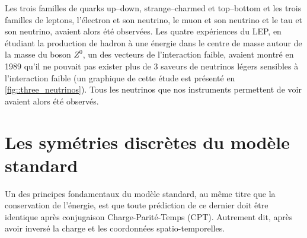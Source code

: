       Les trois familles de quarks up--down, strange--charmed et top--bottom et les trois familles de leptons, l'électron et son neutrino, le muon et son neutrino et le tau et son neutrino, avaient alors été observées. Les quatre expériences du LEP, en étudiant la production de hadron à une énergie dans le centre de masse autour de la masse du boson $Z^0$, un des vecteurs de l'interaction faible, avaient montré en 1989 qu'il ne pouvait pas exister plus de 3 saveurs de neutrinos légers sensibles à l'interaction faible\cite{DeCamp1989} (un graphique de cette étude est présenté en \autoref{fig::three_neutrinos}). Tous les neutrinos que nos instruments permettent de voir avaient alors été observés.

    \section{Les symétries discrètes du modèle standard}\label{sec::CP}

      Un des principes fondamentaux du modèle standard, au même titre que la conservation de l'énergie, est que toute prédiction de ce dernier doit être identique après conjugaison Charge-Parité-Temps (CPT). Autrement dit, après avoir inversé la charge et les coordonnées spatio-temporelles.

